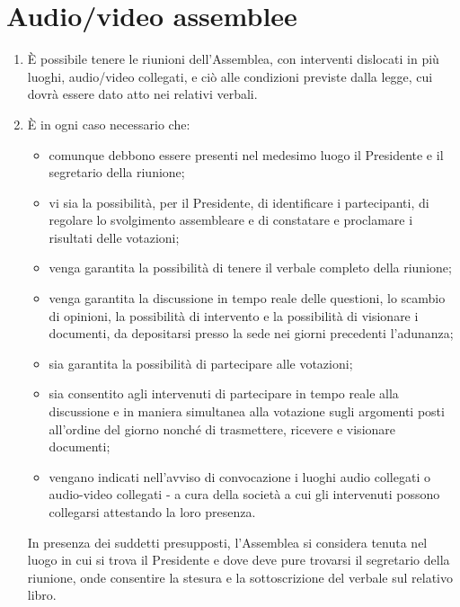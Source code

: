 \documentclass{djtsdoc}
\begin{document}
	\section{Audio/video assemblee}
	\begin{enumerate}
		\item È possibile tenere le riunioni dell'Assemblea, con interventi dislocati in più luoghi, audio/video collegati, e ciò alle condizioni previste dalla legge, cui dovrà essere dato atto nei relativi verbali.
		\item È in ogni caso necessario che:
		\begin{itemize}
			\item comunque debbono essere presenti nel medesimo luogo il Presidente e il segretario della riunione;
			\item vi sia la possibilità, per il Presidente, di identificare i partecipanti, di regolare lo svolgimento assembleare e di constatare e proclamare i risultati delle votazioni;
			\item venga garantita la possibilità di tenere il verbale completo della riunione;
			\item venga garantita la discussione in tempo reale delle questioni, lo scambio di opinioni, la possibilità di intervento e la possibilità di visionare i documenti, da depositarsi presso la sede nei giorni precedenti l'adunanza;
			\item sia garantita la possibilità di partecipare alle votazioni;
			\item sia consentito agli intervenuti di partecipare in tempo reale alla discussione e in maniera simultanea alla votazione sugli argomenti posti all'ordine del giorno nonché di trasmettere, ricevere e visionare documenti;
			\item vengano indicati nell'avviso di convocazione i luoghi audio collegati o audio-video collegati - a cura della società a cui gli intervenuti possono collegarsi attestando la loro presenza.
		\end{itemize}
		In presenza dei suddetti presupposti, l'Assemblea si considera tenuta nel luogo in cui si trova il Presidente e dove deve pure trovarsi il segretario della riunione, onde consentire la stesura e la sottoscrizione del verbale sul relativo libro.
	\end{enumerate}
	
\end{document}
